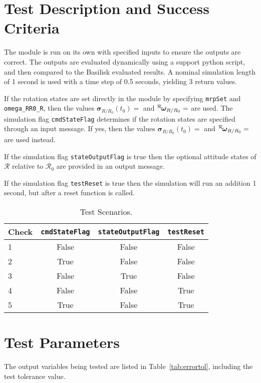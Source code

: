 
\section{Test Description and Success Criteria}
The module is run on its own with specified inputs to ensure the outputs are correct.  The outputs are evaluated dynamically using a support python script, and then compared to the Basilisk evaluated results.  A nominal simulation length of 1 second is used with a time step of 0.5 seconds, yielding 3 return values.

If the rotation states are set directly in the module by specifying {\tt mrpSet} and {\tt omega\_RR0\_R}, then the values $\bm\sigma_{R/R_{0}}(t_{0}) = $ and $\leftexp{R}{\bm\omega}_{R/R_{0}}=$ are used.  The simulation flag {\tt cmdStateFlag} determines if the rotation states are specified through an input message.  If yes, then the values $\bm\sigma_{R/R_{0}}(t_{0}) = $ and $\leftexp{R}{\bm\omega}_{R/R_{0}}=$ are used instead.  

If the simulation flag {\tt stateOutputFlag} is true then  the optional attitude states of $\mathcal{R}$ relative to $\mathcal{R}_{0}$ are provided in an output message.

If the simulation flag {\tt testReset} is true then  the simulation will run an addition 1 second, but after a reset function is called.

\begin{table}[htbp]
	\caption{Test Scenarios.}
	\label{tab:checks}
	\centering \fontsize{10}{10}\selectfont
	\begin{tabular}{ l | c | c | c } %
		\hline\hline
		\textbf{Check}  & {\tt cmdStateFlag} & {\tt stateOutputFlag} & {\tt testReset}  \\ 
		\hline
		1 & False & False & False \\
		2 & True & False & False \\
		3 & False & True & False \\
		4 & False & False & True \\
		5 & True & False & True \\
		\hline\hline
	\end{tabular}
\end{table}

\section{Test Parameters}
The output variables being tested are listed in Table~\ref{tab:errortol}, including the test tolerance value.

